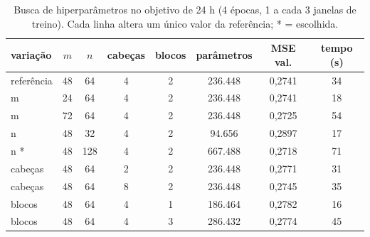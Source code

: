 \begin{table}[!t]
\centering
\caption{Busca de hiperparâmetros no objetivo de 24 h (4 épocas, 1 a cada 3 janelas de treino). Cada linha altera um único valor da referência; * = escolhida.}
\label{tab:busca}
\begin{tabular}{lccccccc}
\hline
variação & $m$ & $n$ & cabeças & blocos & parâmetros & MSE val. & tempo (s) \\
\hline
referência & 48 & 64 & 4 & 2 & 236.448 & 0,2741 & 34 \\
m & 24 & 64 & 4 & 2 & 236.448 & 0,2741 & 18 \\
m & 72 & 64 & 4 & 2 & 236.448 & 0,2725 & 54 \\
n & 48 & 32 & 4 & 2 & 94.656 & 0,2897 & 17 \\
n * & 48 & 128 & 4 & 2 & 667.488 & 0,2718 & 71 \\
cabeças & 48 & 64 & 2 & 2 & 236.448 & 0,2771 & 31 \\
cabeças & 48 & 64 & 8 & 2 & 236.448 & 0,2745 & 35 \\
blocos & 48 & 64 & 4 & 1 & 186.464 & 0,2782 & 16 \\
blocos & 48 & 64 & 4 & 3 & 286.432 & 0,2774 & 45 \\
\hline
\end{tabular}
\end{table}